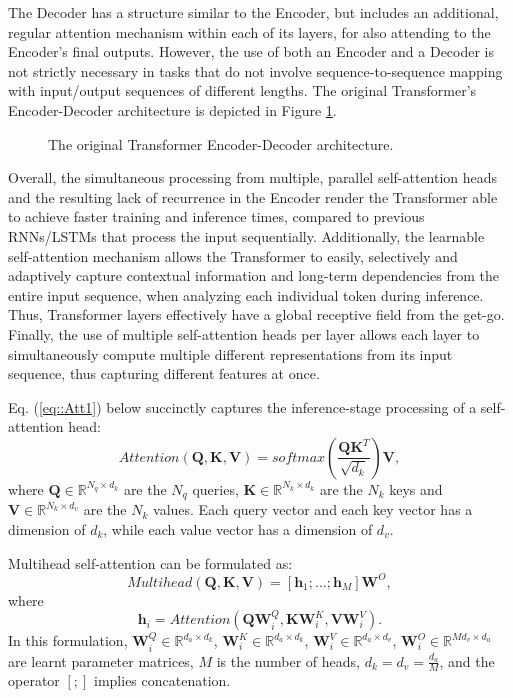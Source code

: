 \documentclass[preprint,review,10pt]{elsarticle}
\begin{document}
	The Decoder has a structure similar to the Encoder, but includes an additional, regular attention mechanism within each of its layers, for also attending to the Encoder's final outputs. However, the use of both an Encoder and a Decoder is not strictly necessary in tasks that do not involve sequence-to-sequence mapping with input/output sequences of different lengths. The original Transformer's Encoder-Decoder architecture is depicted in Figure \ref{fig::TransformerVanilla}.
	
	
	\begin{figure}
		\centering
		
		\caption{The original Transformer Encoder-Decoder architecture.}
		\label{fig::TransformerVanilla}
	\end{figure}
	
	Overall, the simultaneous processing from multiple, parallel self-attention heads and the resulting lack of recurrence in the Encoder render the Transformer able to achieve faster training and inference times, compared to previous RNNs/LSTMs that process the input sequentially. Additionally, the learnable self-attention mechanism allows the Transformer to easily, selectively and adaptively capture contextual information and long-term dependencies from the entire input sequence, when analyzing each individual token during inference. Thus, Transformer layers effectively have a global receptive field from the get-go. Finally, the use of multiple self-attention heads per layer allows each layer to simultaneously compute multiple different representations from its input sequence, thus capturing different features at once.
	
	Eq. (\ref{eq::Att1}) below succinctly captures the inference-stage processing of a self-attention head:
	\begin{equation}
		\label{eq::Att1}
		Attention(\textbf{Q},\textbf{K},\textbf{V}) = softmax(\frac{\textbf{QK}^{T}}{\sqrt{d_k}})\textbf{V},
	\end{equation}
	\noindent where $\textbf{Q} \in \mathbb{R}^{N_q \times d_k}$ are the $N_q$ queries, $\textbf{K} \in \mathbb{R}^{N_k \times d_k}$ are the $N_k$ keys and $\textbf{V} \in \mathbb{R}^{N_k \times d_v}$ are the $N_k$ values. Each query vector and each key vector has a dimension of $d_k$, while each value vector has a dimension of $d_v$.
	
	Multihead self-attention can be formulated as:
	\begin{equation}
		Multihead(\textbf{Q},\textbf{K},\textbf{V}) = [\textbf{h}_1;...;\textbf{h}_{M}]\textbf{W}^O,
	\end{equation}
	\noindent where
	\begin{equation}
		\textbf{h}_i = Attention(\textbf{Q}\textbf{W}^{Q}_i, \textbf{K}\textbf{W}^{K}_i, \textbf{V}\textbf{W}^{V}_i).
	\end{equation}
	\noindent In this formulation, $\textbf{W}^{Q}_i \in \mathbb{R}^{d_a \times d_k}$, $\textbf{W}^{K}_i \in \mathbb{R}^{d_a \times d_k}$, $\textbf{W}^{V}_i \in \mathbb{R}^{d_a \times d_v}$, $\textbf{W}^{O}_i \in \mathbb{R}^{M d_v \times d_a}$ are learnt parameter matrices, $M$ is the number of heads, $d_k=d_v=\frac{d_a}{M}$, and the operator $[;]$ implies concatenation.
	
\end{document}
